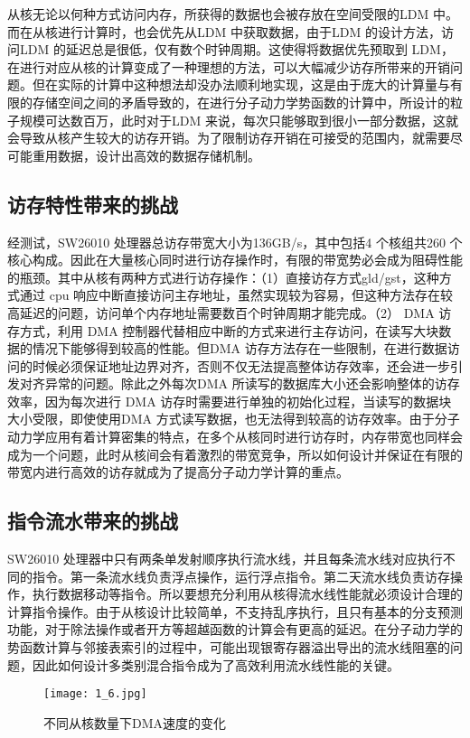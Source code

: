 从核无论以何种方式访问内存，所获得的数据也会被存放在空间受限的LDM 中。而在从核进行计算时，也会优先从LDM 中获取数据，由于LDM 的设计方法，访问LDM 的延迟总是很低，仅有数个时钟周期。这使得将数据优先预取到 LDM，在进行对应从核的计算变成了一种理想的方法，可以大幅减少访存所带来的开销问题。但在实际的计算中这种想法却没办法顺利地实现，这是由于庞大的计算量与有限的存储空间之间的矛盾导致的，在进行分子动力学势函数的计算中，所设计的粒子规模可达数百万，此时对于LDM 来说，每次只能够取到很小一部分数据，这就会导致从核产生较大的访存开销。为了限制访存开销在可接受的范围内，就需要尽可能重用数据，设计出高效的数据存储机制。

\subsection{访存特性带来的挑战}
经测试，SW26010 处理器总访存带宽大小为136GB/s，其中包括4 个核组共260 个核心构成。因此在大量核心同时进行访存操作时，有限的带宽势必会成为阻碍性能的瓶颈。其中从核有两种方式进行访存操作：（1）直接访存方式gld/gst，这种方式通过 cpu 响应中断直接访问主存地址，虽然实现较为容易，但这种方法存在较高延迟的问题，访问单个内存地址需要数百个时钟周期才能完成。（2） DMA 访存方式，利用 DMA 控制器代替相应中断的方式来进行主存访问，在读写大块数据的情况下能够得到较高的性能。但DMA 访存方法存在一些限制，在进行数据访问的时候必须保证地址边界对齐，否则不仅无法提高整体访存效率，还会进一步引发对齐异常的问题。除此之外每次DMA 所读写的数据库大小还会影响整体的访存效率，因为每次进行 DMA 访存时需要进行单独的初始化过程，当读写的数据块大小受限，即使使用DMA 方式读写数据，也无法得到较高的访存效率。由于分子动力学应用有着计算密集的特点，在多个从核同时进行访存时，内存带宽也同样会成为一个问题，此时从核间会有着激烈的带宽竞争，所以如何设计并保证在有限的带宽内进行高效的访存就成为了提高分子动力学计算的重点。

\subsection{指令流水带来的挑战}
SW26010 处理器中只有两条单发射顺序执行流水线，并且每条流水线对应执行不同的指令。第一条流水线负责浮点操作，运行浮点指令。第二天流水线负责访存操作，执行数据移动等指令。所以要想充分利用从核得流水线性能就必须设计合理的计算指令操作。由于从核设计比较简单，不支持乱序执行，且只有基本的分支预测功能，对于除法操作或者开方等超越函数的计算会有更高的延迟。在分子动力学的势函数计算与邻接表索引的过程中，可能出现银寄存器溢出导出的流水线阻塞的问题，因此如何设计多类别混合指令成为了高效利用流水线性能的关键。

 \begin{figure}[h]
  \centering
  \texttt{[image: 1\_6.jpg]}
  \caption{不同从核数量下DMA速度的变化}
\end{figure}

